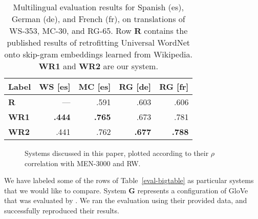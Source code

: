 \documentclass[11pt,letterpaper]{article}
\begin{document}
\begin{table}[t]
\centering
\begin{tabular}{lrrrr}
\toprule
Label   & WS [es] & MC [es] & RG [de] & RG [fr] \\
\midrule
\bf R   &         --- &       .591 &       .603 &       .606 \\
\bf WR1 &    \bf .444 &   \bf .765 &       .673 &       .781 \\
\bf WR2 &        .441 &       .762 &   \bf .677 &   \bf .788 \\
\bottomrule
\end{tabular}

\caption{
    Multilingual evaluation results for Spanish (es), German (de), and French
    (fr), on translations of WS-353, MC-30, and RG-65. Row {\bf R} contains the
    published results of retrofitting
    Universal WordNet onto skip-gram embeddings learned from Wikipedia.
    {\bf WR1} and {\bf WR2} are our system.
}
\label{eval-multilingual}
\end{table}

\begin{figure}
\caption{
    Systems discussed in this paper, plotted according to their $\rho$
    correlation with MEN-3000 and RW.
}
\label{compare-graph}
\end{figure}


We have labeled some of the rows of Table~\ref{eval-bigtable} as particular systems
that we would like to compare. System {\bf G} represents a configuration of
GloVe that was evaluated by . We ran the evaluation
using their provided data, and successfully reproduced their results.
\end{document}
